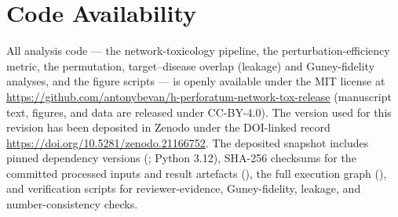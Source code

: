 \section*{Code Availability}

All analysis code --- the network-toxicology pipeline, the perturbation-efficiency
metric, the permutation, target--disease overlap (leakage) and Guney-fidelity
analyses, and the figure scripts --- is openly available under the MIT
license at \url{https://github.com/antonybevan/h-perforatum-network-tox-release}
(manuscript text, figures, and data are released under CC-BY-4.0). The
version used for this revision has been deposited in Zenodo under the DOI-linked
record \url{https://doi.org/10.5281/zenodo.21166752}.
The deposited snapshot includes pinned dependency versions
(; Python 3.12), SHA-256 checksums for the committed processed
inputs and result artefacts (), the full execution graph
(), and verification scripts for reviewer-evidence,
Guney-fidelity, leakage, and number-consistency checks.
